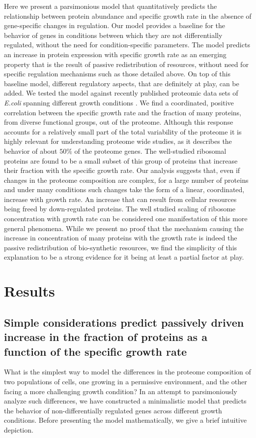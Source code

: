 \documentclass[10pt,letterpaper]{article}
\begin{document}
Here we present a parsimonious model that quantitatively predicts the relationship between protein abundance and specific growth rate in the absence of gene-specific changes in regulation.
Our model provides a baseline for the behavior of genes in conditions between which they are not differentially regulated, without the need for condition-specific parameters.
The model predicts an increase in protein expression with specific growth rate as an emerging property that is the result of passive redistribution of resources, without need for specific regulation mechanisms such as those detailed above.
On top of this baseline model, different regulatory aspects, that are definitely at play, can be added.
We tested the model against recently published proteomic data sets of \emph{E.coli} spanning different growth conditions \cite{Valgepea2013,Peebo_2015,Schmidt2015,Hui_2015}.
We find a coordinated, positive correlation between the specific growth rate and the fraction of many proteins, from diverse functional groups, out of the proteome.
Although this response accounts for a relatively small part of the total variability of the proteome it is highly relevant for understanding proteome wide studies, as it describes the behavior of about $50\%$ of the proteome genes.
The well-studied ribosomal proteins are found to be a small subset of this group of proteins that increase their fraction with the specific growth rate.
Our analysis suggests that, even if changes in the proteome composition are complex, for a large number of proteins and under many conditions such changes take the form of a linear, coordinated, increase with growth rate.
An increase that can result from cellular resources being freed by down-regulated proteins.
The well studied scaling of ribosome concentration with growth rate can be considered one manifestation of this more general phenomena.
While we present no proof that the mechanism causing the increase in concentration of many proteins with the growth rate is indeed the passive redistribution of bio-synthetic resources, we find the simplicity of this explanation to be a strong evidence for it being at least a partial factor at play.

\section*{Results}

\subsection*{Simple considerations predict passively driven increase in the fraction of proteins as a function of the specific growth rate}
What is the simplest way to model the differences in the proteome composition of two populations of cells, one growing in a permissive environment, and the other facing a more challenging growth condition?
In an attempt to parsimoniously analyze such differences, we have constructed a minimalistic model that predicts the behavior of non-differentially regulated genes across different growth conditions.
Before presenting the model mathematically, we give a brief intuitive depiction.
\end{document}
